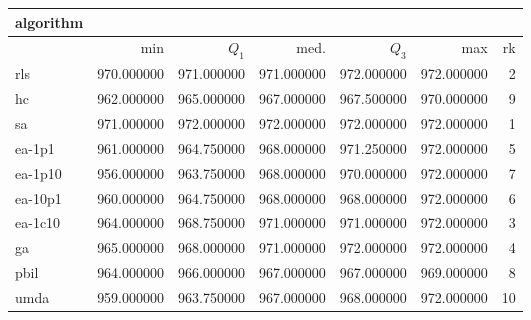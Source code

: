 \begin{tabular}{@{}l*{5}{>{{}}N{3}{0}}>{{}}N{2}{0}@{}}
\toprule
{algorithm} &  \\
\midrule
& {min} & {$Q_1$} & {med.} & {$Q_3$} & {max} & {rk}\\
\midrule
rls & 970.000000 & 971.000000 & 971.000000 & {\color{blue}} 972.000000 & {\color{blue}} 972.000000 & 2\\
hc & 962.000000 & 965.000000 & 967.000000 & 967.500000 & 970.000000 & 9\\
sa & {\color{blue}} 971.000000 & {\color{blue}} 972.000000 & {\color{blue}} 972.000000 & {\color{blue}} 972.000000 & {\color{blue}} 972.000000 & 1\\
ea-1p1 & 961.000000 & 964.750000 & 968.000000 & 971.250000 & {\color{blue}} 972.000000 & 5\\
ea-1p10 & 956.000000 & 963.750000 & 968.000000 & 970.000000 & {\color{blue}} 972.000000 & 7\\
ea-10p1 & 960.000000 & 964.750000 & 968.000000 & 968.000000 & {\color{blue}} 972.000000 & 6\\
ea-1c10 & 964.000000 & 968.750000 & 971.000000 & 971.000000 & {\color{blue}} 972.000000 & 3\\
ga & 965.000000 & 968.000000 & 971.000000 & {\color{blue}} 972.000000 & {\color{blue}} 972.000000 & 4\\
pbil & 964.000000 & 966.000000 & 967.000000 & 967.000000 & 969.000000 & 8\\
umda & 959.000000 & 963.750000 & 967.000000 & 968.000000 & {\color{blue}} 972.000000 & 10\\
\bottomrule
\end{tabular}
